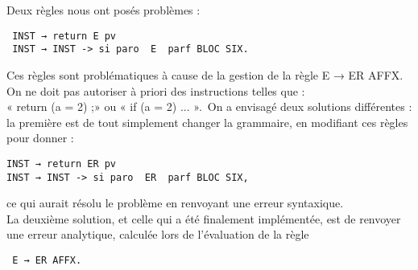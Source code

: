 
Deux règles nous ont posés problèmes :\\
\begin{verbatim}
 INST → return E pv 
 INST → INST -> si paro  E  parf BLOC SIX.
\end{verbatim}

Ces règles sont problématiques à cause de la gestion de la règle E → ER AFFX. On
ne doit pas autoriser à priori des instructions telles que :\\
 « return (a = 2) ;» ou « if (a = 2) {...} ».\
On a envisagé deux solutions différentes : la première est de tout simplement
changer la grammaire, en modifiant ces règles pour donner : \\

\begin{verbatim}
INST → return ER pv
INST → INST -> si paro  ER  parf BLOC SIX,
\end{verbatim}

ce qui aurait résolu le problème en renvoyant une erreur syntaxique.\\

La deuxième solution, et celle qui a été finalement implémentée, est de renvoyer
une erreur analytique, calculée lors de l'évaluation de la règle\\

\begin{verbatim}
 E → ER AFFX.
\end{verbatim}

